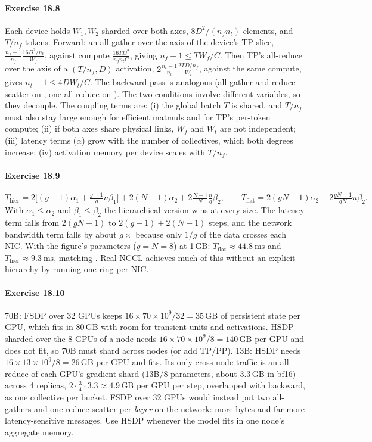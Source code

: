 \paragraph{Exercise 18.8}
Each device holds $W_1, W_2$ sharded over both axes, $8D^2/(n_fn_t)$ elements, and $T/n_f$ tokens.
Forward: an all-gather over the  axis of the device's TP slice,
$\frac{n_f-1}{n_f}\frac{16D^2/n_t}{W_f}$, against compute $\frac{16TD^2}{n_fn_tC}$, giving
$n_f-1\le TW_f/C$. Then TP's all-reduce over the  axis of a $(T/n_f, D)$ activation,
$2\frac{n_t-1}{n_t}\frac{2TD/n_f}{W_t}$, against the same compute, gives $n_t-1\le 4DW_t/C$. The backward
pass is analogous (all-gather and reduce-scatter on , one all-reduce on ). The two
conditions involve different variables, so they decouple. The coupling terms are: (i) the global
batch $T$ is shared, and $T/n_f$ must also stay large enough for efficient matmuls and for TP's
per-token compute; (ii) if both axes share physical links, $W_f$ and $W_t$ are not independent;
(iii) latency terms ($\alpha$) grow with the number of collectives, which both degrees increase;
(iv) activation memory per device scales with $T/n_f$.

\paragraph{Exercise 18.9}
\[
T_\text{hier} = 2\Big[(g-1)\alpha_1 + \tfrac{g-1}{g}n\beta_1\Big] + 2(N-1)\alpha_2 + 2\tfrac{N-1}{N}\tfrac{n}{g}\beta_2,
\qquad
T_\text{flat} = 2(gN-1)\alpha_2 + 2\tfrac{gN-1}{gN}n\beta_2 .
\]
With $\alpha_1\le\alpha_2$ and $\beta_1\le\beta_2$ the hierarchical version wins at every size. The
latency term falls from $2(gN-1)$ to $2(g-1)+2(N-1)$ steps, and the network bandwidth term falls by
about $g\times$ because only $1/g$ of the data crosses each NIC. With the figure's parameters
($g=N=8$) at 1\,GB: $T_\text{flat}\approx\SI{44.8}{\milli\second}$ and
$T_\text{hier}\approx\SI{9.3}{\milli\second}$, matching . Real NCCL achieves
much of this without an explicit hierarchy by running one ring per NIC.

\paragraph{Exercise 18.10}
70B: FSDP over 32 GPUs keeps $16\times70\times10^9/32=35$\,GB of persistent state per GPU, which fits in
80\,GB with room for transient units and activations. HSDP sharded over the 8 GPUs of a node needs
$16\times70\times10^9/8=140$\,GB per GPU and does not fit, so 70B must shard across nodes (or add TP/PP).
13B: HSDP needs $16\times13\times10^9/8=26$\,GB per GPU and fits. Its only cross-node traffic is an
all-reduce of each GPU's gradient shard (13B$/8$ parameters, about 3.3\,GB in bf16) across 4 replicas,
$2\cdot\frac34\cdot3.3\approx4.9$\,GB per GPU per step, overlapped with backward, as one collective
per bucket. FSDP over 32 GPUs would instead put two all-gathers and one reduce-scatter per
\emph{layer} on the network: more bytes and far more latency-sensitive messages. Use HSDP whenever
the model fits in one node's aggregate memory.

